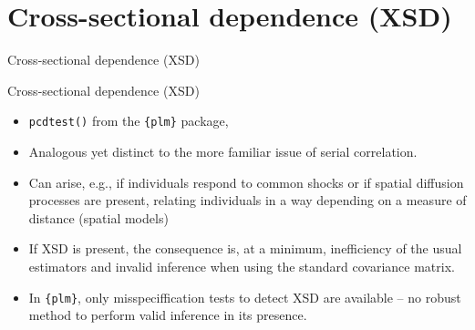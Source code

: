 \documentclass{beamer}
\begin{document}
\section{Cross-sectional dependence (XSD)}
\begin{frame}{Cross-sectional dependence (XSD)}
\end{frame}
\begin{frame}{Cross-sectional dependence (XSD)}
\begin{itemize}
    \item \texttt{pcdtest()} from the \texttt{\{plm\}} package, 
    \item Analogous yet distinct to the more familiar issue of serial correlation.
    \smallskip
    \item Can arise, e.g., if individuals respond to common shocks or if spatial diffusion processes are present, relating individuals in a way depending on a measure of distance (spatial models)
    \smallskip
    \item If XSD is present, the consequence is, at a minimum, inefficiency of the usual estimators and invalid inference when using the standard covariance matrix.
    \smallskip
    \item In \texttt{\{plm\}}, only misspeciffication tests to detect XSD are available – no robust method to perform valid inference in its presence.
\end{itemize}
\end{frame}























\end{document}
